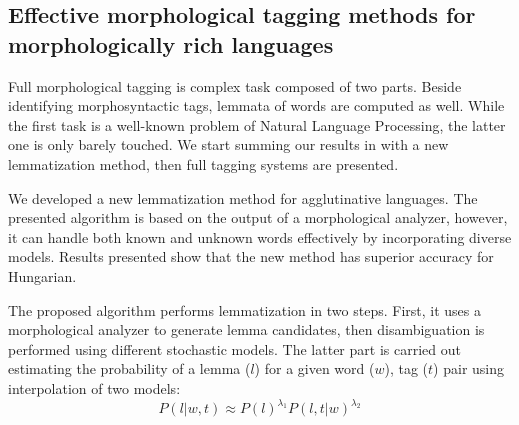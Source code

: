\let\oldthesubsection=\thesubsection
\renewcommand{\thesubsection}{\Roman{subsection}}

%
%

\subsection{Effective morphological tagging methods for morphologically rich languages} %
\label{thes:morf}

Full morphological tagging is complex task composed of two parts. 
Beside identifying morphosyntactic tags, lemmata of words are computed as well.
While the first task is a well-known problem of Natural Language Processing, the latter one is only barely touched.
We start summing our results in with a new lemmatization method, then full tagging systems are presented. 


\begin{core}
\begin{thesis}\label{thes:morf-lemma}
We developed a new lemmatization method for agglutinative languages.
The presented algorithm is based on the output of a morphological analyzer, however, it can handle both known and unknown words effectively by incorporating diverse models. 
Results presented show that the new method has superior accuracy for Hungarian.
\end{thesis} 

\begin{pub}
\cite{Orosz2011,Orosz2012,Orosz2012a,Orosz2013a}
\end{pub}
\end{core}

The proposed algorithm performs lemmatization in two steps. 
First, it uses a morphological analyzer to generate lemma candidates, then disambiguation is performed using different stochastic models.
The latter part is carried out estimating the probability of a lemma ($l$) for a given word ($w$), tag ($t$) pair using interpolation of two models:
\begin{equation}\label{lemma-interpolated}
P(l|w,t) \approx P(l)^{\lambda_1} P(l,t|w)^{\lambda_2} %
\end{equation}

